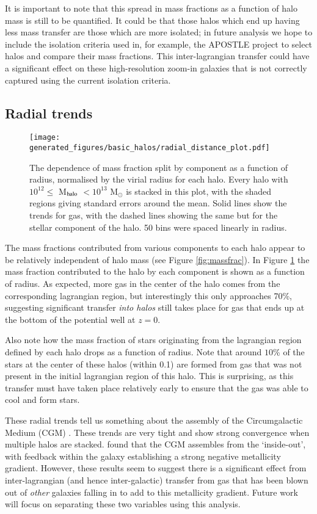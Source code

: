It is important to note that this spread in mass fractions as a function of
halo mass is still to be quantified. It could be that those halos which
end up having less mass transfer are those which are more isolated; in future
analysis we hope to include the isolation criteria used in, for example, the
APOSTLE project \citep{fattahi2016} to select halos and compare their mass
fractions. This inter-lagrangian transfer could have a significant effect
on these high-resolution zoom-in galaxies that is not correctly captured
using the current isolation criteria.

\subsection{Radial trends}

\begin{figure} \centering
	\texttt{[image: generated\_figures/basic\_halos/radial\_distance\_plot.pdf]}
	\caption{The dependence of mass fraction split by component as a
	function of radius, normalised by the virial radius for each halo.
	Every halo with $10^{12} \leq $ M$_{\rm halo}$ $ < 10^{13}$ M$_\odot$
	is stacked in this plot, with the shaded regions giving standard errors
	around the mean. Solid lines show the trends for gas, with the dashed
	lines showing the same but for the stellar component of the halo. 50
	bins were spaced linearly in radius.} \label{fig:radialmassfrac}
\end{figure}

The mass fractions contributed from various components to each halo appear to
be relatively independent of halo mass (see Figure \ref{fig:massfrac}). In
Figure \ref{fig:radialmassfrac} the mass fraction contributed to the halo by
each component is shown as a function of radius. As expected, more gas in the
center of the halo comes from the corresponding lagrangian region, but
interestingly this only approaches 70\%, suggesting significant transfer
\emph{into halos} still takes place for gas that ends up at the bottom of the
potential well at $z=0$.

Also note how the mass fraction of stars originating from the lagrangian
region defined by each halo drops as a function of radius. Note that around
$10$\% of the stars at the center of these halos (within 0.1\rvir{})
are formed from gas that was not present in the initial lagrangian region of
this halo. This is surprising, as this transfer must have taken place
relatively early to ensure that the gas was able to cool and form stars.

These radial trends tell us something about the assembly of the
Circumgalactic Medium (CGM) \citep{tumlinson2017}. These trends are very
tight and show strong convergence when multiple halos are stacked.
\citet{Crain2013} found that the CGM assembles from the `inside-out', with
feedback within the galaxy establishing a strong negative metallicity
gradient. However, these results seem to suggest there is a significant
effect from inter-lagrangian (and hence inter-galactic) transfer from gas
that has been blown out of \emph{other} galaxies falling in to add to this
metallicity gradient. Future work will focus on separating these two
variables using this analysis.

